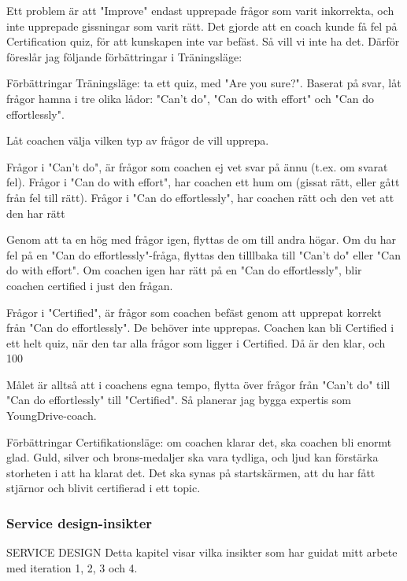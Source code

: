 Ett problem är att "Improve" endast upprepade frågor som varit inkorrekta, och inte upprepade gissningar som varit rätt. Det gjorde att en coach kunde få fel på Certification quiz, för att kunskapen inte var befäst. Så vill vi inte ha det. Därför föreslår jag följande förbättringar i Träningsläge:

Förbättringar Träningsläge: ta ett quiz, med "Are you sure?". Baserat på svar, låt frågor hamna i tre olika lådor: "Can't do", "Can do with effort" och "Can do effortlessly".

Låt coachen välja vilken typ av frågor de vill upprepa.

Frågor i "Can't do", är frågor som coachen ej vet svar på ännu (t.ex. om svarat fel).
Frågor i "Can do with effort", har coachen ett hum om (gissat rätt, eller gått från fel till rätt).
Frågor i "Can do effortlessly", har coachen rätt och den vet att den har rätt

Genom att ta en hög med frågor igen, flyttas de om till andra högar. Om du har fel på en "Can do effortlessly"-fråga, flyttas den tilllbaka till "Can't do" eller "Can do with effort". Om coachen igen har rätt på en "Can do effortlessly", blir coachen certified i just den frågan.

Frågor i "Certified", är frågor som coachen befäst genom att upprepat korrekt från "Can do effortlessly". De behöver inte upprepas. Coachen kan bli Certified i ett helt quiz, när den tar alla frågor som ligger i Certified. Då är den klar, och 100%

Målet är alltså att i coachens egna tempo, flytta över frågor från "Can't do" till "Can do effortlessly" till "Certified". Så planerar jag bygga expertis som YoungDrive-coach.

Förbättringar Certifikationsläge: om coachen klarar det, ska coachen bli enormt glad. Guld, silver och brons-medaljer ska vara tydliga, och ljud kan förstärka storheten i att ha klarat det. Det ska synas på startskärmen, att du har fått stjärnor och blivit certifierad i ett topic.

\subsubsection{Service design-insikter}

SERVICE DESIGN
Detta kapitel visar vilka insikter som har guidat mitt arbete med iteration 1, 2, 3 och 4.

